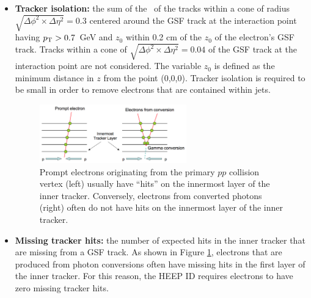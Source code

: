 \begin{itemize}
    HCAL RecHits within a cone of $\sqrt{\Delta\phi^2\times\Delta\eta^2} = 0.15$ are excluded from this
    sum.  In this context, depth 2 is defined as all depths that are not included in depth 1
    for towers 18-29. The depth segmentation of the HCAL is described in Section
    \ref{sec:hcal} and shown in Figure \ref{fig:hcal-segmentation}. HCAL depth 2 isolation is 
    required to be small in order to remove electrons that are contained
    within jets.
  \item {\bf Tracker isolation:} the sum of the \pt~of the tracks within a cone
    of radius $\sqrt{\Delta\phi^2\times\Delta\eta^2} = 0.3$ centered around the GSF track at the interaction
    point having $p_{\text{T}} > 0.7$~GeV and 
    $z_0$ within 0.2 cm of the $z_0$ of the electron's GSF track.
    Tracks within a cone of $\sqrt{\Delta\phi^2\times\Delta\eta^2} = 0.04$ of the GSF track at the interaction
    point are not considered.  The variable $z_0$ is defined as the minimum distance in $z$ from the
    point (0,0,0).  Tracker isolation is 
    required to be small in order to remove electrons that are contained
    within jets.
\begin{figure}
  \centering
  \includegraphics[width=0.6\textwidth]{tex/analysis/object_selection/fig/heep-conversions.png}
  \caption{
    Prompt electrons originating from the primary $pp$ collision vertex (left) usually have
    ``hits'' on the innermost layer of the inner tracker.  Conversely, electrons from
    converted photons (right) often do not have hits on the innermost layer of the inner tracker.
  }
  \label{fig:heep-conversions}
\end{figure}
  \item {\bf Missing tracker hits:} the number of expected hits in the inner tracker that are missing from a GSF track.
    As shown in Figure \ref{fig:heep-conversions}, electrons that are produced from photon conversions often have
    missing hits in the first layer of the inner tracker.  For this reason, the HEEP ID requires electrons
    to have zero missing tracker hits.
\end{itemize}

